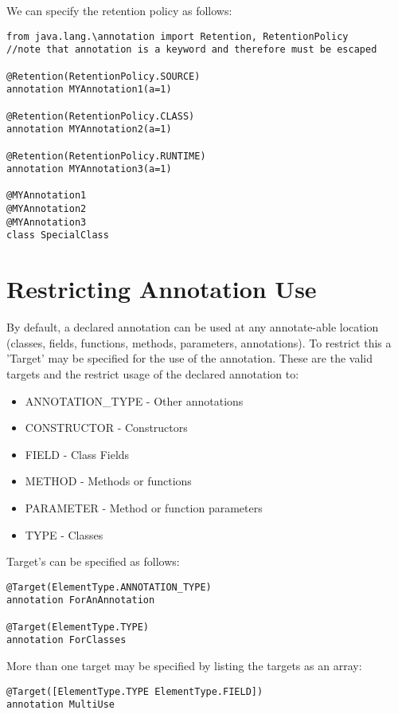 \documentclass[conc-doc]{subfiles}
\begin{document}
We can specify the retention policy as follows:

\begin{lstlisting}
from java.lang.\annotation import Retention, RetentionPolicy
//note that annotation is a keyword and therefore must be escaped

@Retention(RetentionPolicy.SOURCE)
annotation MYAnnotation1(a=1)

@Retention(RetentionPolicy.CLASS)
annotation MYAnnotation2(a=1)

@Retention(RetentionPolicy.RUNTIME)
annotation MYAnnotation3(a=1)

@MYAnnotation1
@MYAnnotation2
@MYAnnotation3
class SpecialClass
\end{lstlisting}

\section{Restricting Annotation Use}
By default, a declared annotation can be used at any annotate-able location (classes, fields, functions, methods, parameters, annotations). To restrict this a 'Target' may be specified for the use of the annotation. These are the valid targets and the restrict usage of the declared annotation to:

\begin{itemize}
	\item ANNOTATION\_TYPE - Other annotations
	\item CONSTRUCTOR - Constructors
	\item FIELD - Class Fields
	\item METHOD - Methods or functions 
	\item PARAMETER - Method or function parameters
	\item TYPE - Classes
\end{itemize}

Target's can be specified as follows:

\begin{lstlisting}
@Target(ElementType.ANNOTATION_TYPE)
annotation ForAnAnnotation

@Target(ElementType.TYPE)
annotation ForClasses
\end{lstlisting}

More than one target may be specified by listing the targets as an array:

\begin{lstlisting}
@Target([ElementType.TYPE ElementType.FIELD])
annotation MultiUse
\end{lstlisting}
\end{document}
